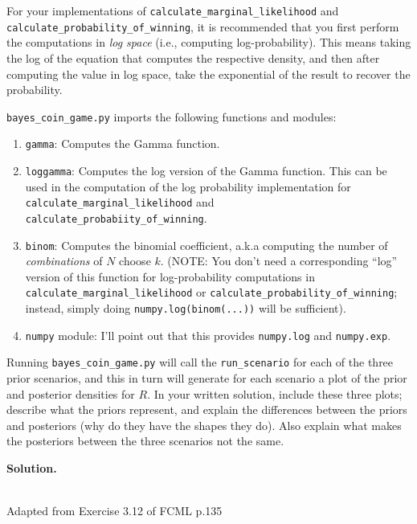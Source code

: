 \documentclass[10pt]{article}
\begin{document}
\begin{itemize}
For your implementations of {\tt calculate\_marginal\_likelihood} and {\tt calculate\_probability\_of\_winning}, it is recommended that you first perform the computations in {\em log space} (i.e., computing log-probability). This means taking the log of the equation that computes the respective density, and then after computing the value in log space, take the exponential of the result to recover the probability.

{\tt bayes\_coin\_game.py} imports the following functions and modules:
\begin{enumerate}
\item {\tt gamma}: Computes the Gamma function.
\item {\tt loggamma}: Computes the log version of the Gamma function. This can be used in the computation of the log probability implementation for {\tt calculate\_marginal\_likelihood} and \\ {\tt calculate\_probabiity\_of\_winning}.
\item {\tt binom}: Computes the binomial coefficient, a.k.a computing the number of {\em combinations} of $N$ choose $k$. (NOTE: You don't need a corresponding ``log'' version of this function for log-probability computations in {\tt calculate\_marginal\_likelihood} or {\tt calculate\_probability\_of\_winning}; instead, simply doing {\tt numpy.log(binom(...))} will be sufficient).
\item {\tt numpy} module: I'll point out that this provides {\tt numpy.log} and {\tt numpy.exp}.
\end{enumerate}



Running {\tt bayes\_coin\_game.py} will call the {\tt run\_scenario} for each
of the three prior scenarios, and this in turn will generate for each scenario
a plot of the prior and posterior densities for $R$. In your written solution, include these three plots; describe what the priors represent, and explain the differences between the priors and posteriors (why do they have the shapes they do). Also explain what makes the posteriors between the three scenarios not the same.

{\bf Solution.}



{\bf \large
\vspace{20pt}\item[3.]  [5 points; \boldred{Required only for Graduates}]\\
Adapted from Exercise 3.12 of FCML p.135}



\end{itemize}
\end{document}
